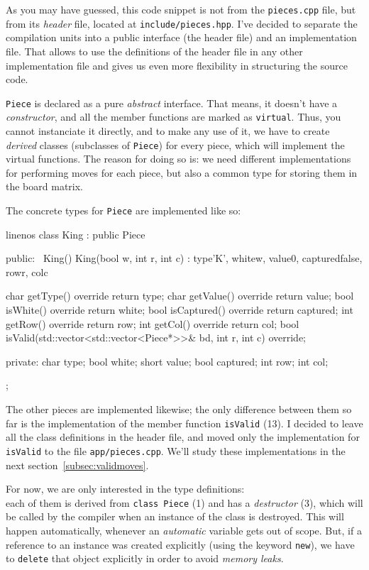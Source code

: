 As you may have guessed, this code snippet is not from the \texttt{pieces.cpp} file, but from its
\emph{header} file, located at \texttt{include/pieces.hpp}.
I've decided to separate the compilation units into a public interface (the header file) and
an implementation file.
That allows to use the definitions of the header file in any other implementation file and
gives us even more flexibility in structuring the source code.

\texttt{Piece} is declared as a pure \emph{abstract} interface.
That means, it doesn't have a \emph{constructor}, and all the member functions are marked
as \texttt{virtual}.
Thus, you cannot instanciate it directly, and to make any use of it, we have to create
\emph{derived} classes (subclasses of \texttt{Piece}) for every piece, which will
implement the virtual functions.
The reason for doing so is: we need different implementations for performing moves for
each piece, but also a common type for storing them in the board matrix. 

The concrete types for \texttt{Piece} are implemented like so:

\begin{cpp*}{linenos}
class King : public Piece {
public:
  ~King() {}
  King(bool w, int r, int c) : type{'K'}, white{w}, value{0},
                              captured{false}, row{r}, col{c} {}

  char getType() override { return type; }
  char getValue() override { return value; }
  bool isWhite() override { return white; }
  bool isCaptured() override { return captured; }
  int getRow() override { return row; }
  int getCol() override { return col; }
  bool isValid(std::vector<std::vector<Piece*>>& bd, int r, int c)
    override;

private:
  char type;
  bool white;
  short value;
  bool captured;
  int row;
  int col;
};
\end{cpp*}

The other pieces are implemented likewise; the only difference between them so far is the
implementation of the member function \texttt{isValid} (13).
I decided to leave all the class definitions in the header file, and moved only the
implementation for \texttt{isValid} to the file \texttt{app/pieces.cpp}.
We'll study these implementations in the next section~\ref{subsec:validmoves}.

For now, we are only interested in the type definitions:\\
each of them is derived from \texttt{class Piece} (1) and has a \emph{destructor} (3),
which will be called by the compiler when an instance of the class is destroyed.
This will happen automatically, whenever an \emph{automatic} variable gets out of scope.
But, if a reference to an instance was created explicitly (using the keyword \texttt{new}),
we have to \texttt{delete} that object explicitly in order to avoid \emph{memory leaks}.

